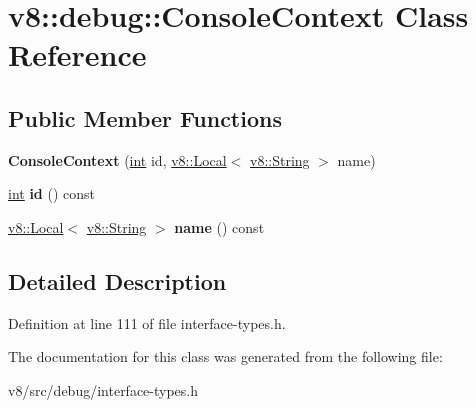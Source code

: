 \hypertarget{classv8_1_1debug_1_1ConsoleContext}{}\section{v8\+:\+:debug\+:\+:Console\+Context Class Reference}
\label{classv8_1_1debug_1_1ConsoleContext}
\subsection*{Public Member Functions}
\begin{DoxyCompactItemize}
\item 
\mbox{\label{classv8_1_1debug_1_1ConsoleContext_a03e1a1772eed05318a5811d2b4670421}} 
{\bfseries Console\+Context} (\mbox{\hyperlink{classint}{int}} id, \mbox{\hyperlink{classv8_1_1Local}{v8\+::\+Local}}$<$ \mbox{\hyperlink{classv8_1_1String}{v8\+::\+String}} $>$ name)
\item 
\mbox{\label{classv8_1_1debug_1_1ConsoleContext_a9d1d71e6fa4eab14b9ec70eb44ba1396}} 
\mbox{\hyperlink{classint}{int}} {\bfseries id} () const
\item 
\mbox{\label{classv8_1_1debug_1_1ConsoleContext_a702fb7e2b9518fd537f19d4e0334728d}} 
\mbox{\hyperlink{classv8_1_1Local}{v8\+::\+Local}}$<$ \mbox{\hyperlink{classv8_1_1String}{v8\+::\+String}} $>$ {\bfseries name} () const
\end{DoxyCompactItemize}


\subsection{Detailed Description}


Definition at line 111 of file interface-\/types.\+h.



The documentation for this class was generated from the following file\+:\begin{DoxyCompactItemize}
\item 
v8/src/debug/interface-\/types.\+h\end{DoxyCompactItemize}
